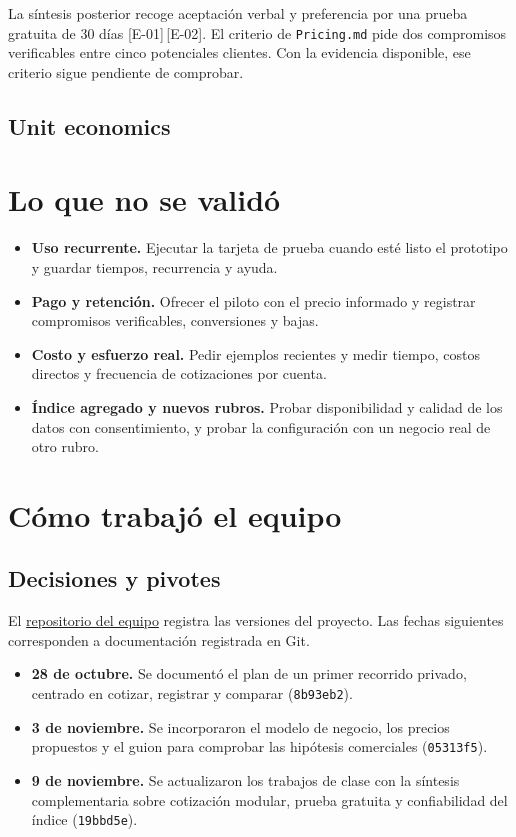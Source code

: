 \documentclass[11pt]{article}
\newcommand{\ev}[1]{\textcolor{prblue}{[#1]}}
\begin{document}
La síntesis posterior recoge aceptación verbal y preferencia por
una prueba gratuita de 30 días \ev{E-01}\,\ev{E-02}. El criterio de
\texttt{Pricing.md} pide dos compromisos verificables entre cinco
potenciales clientes. Con la evidencia disponible, ese criterio
sigue pendiente de comprobar.

\subsection{Unit economics}


\section{Lo que no se validó}
\begin{itemize}
  \item \textbf{Uso recurrente.} Ejecutar la tarjeta de prueba cuando
  esté listo el prototipo y guardar tiempos, recurrencia y ayuda.
  \item \textbf{Pago y retención.} Ofrecer el piloto con el precio
  informado y registrar compromisos verificables, conversiones y bajas.
  \item \textbf{Costo y esfuerzo real.} Pedir ejemplos recientes y
  medir tiempo, costos directos y frecuencia de cotizaciones por cuenta.
  \item \textbf{Índice agregado y nuevos rubros.} Probar disponibilidad
  y calidad de los datos con consentimiento, y probar la configuración
  con un negocio real de otro rubro.
\end{itemize}

\section{Cómo trabajó el equipo}

\subsection{Decisiones y pivotes}
El \href{https://github.com/Mharko8849/Proyecto-Innova}{repositorio del
equipo} registra las versiones del proyecto. Las fechas siguientes
corresponden a documentación registrada en Git.
\begin{itemize}
  \item \textbf{28 de octubre.} Se documentó el plan de un primer
  recorrido privado, centrado en cotizar, registrar y comparar
  (\texttt{8b93eb2}).
  \item \textbf{3 de noviembre.} Se incorporaron el modelo de negocio,
  los precios propuestos y el guion para comprobar las hipótesis
  comerciales (\texttt{05313f5}).
  \item \textbf{9 de noviembre.} Se actualizaron los trabajos de clase
  con la síntesis complementaria sobre cotización modular, prueba
  gratuita y confiabilidad del índice (\texttt{19bbd5e}).
\end{itemize}
\end{document}

